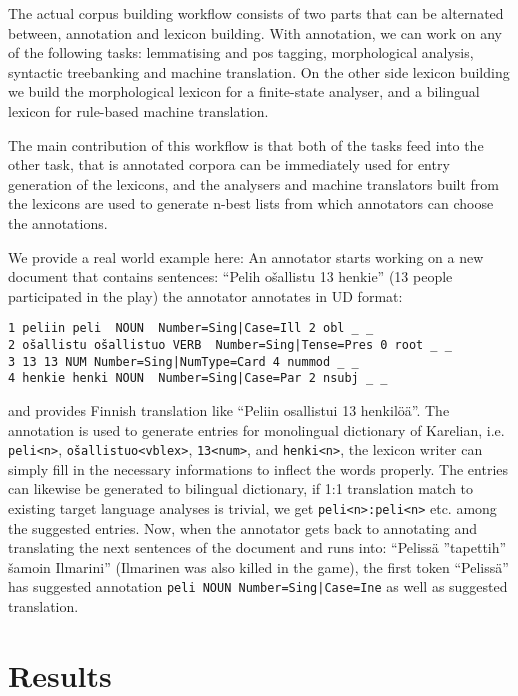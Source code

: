 \documentclass{flammie}
\begin{document}
The actual corpus building workflow consists of two parts that can be
alternated between, annotation and lexicon building. With annotation, we can
work on any of the following tasks: lemmatising and pos tagging, morphological
analysis, syntactic treebanking and machine translation. On the other side
lexicon building we build the morphological lexicon for a finite-state analyser,
and a bilingual lexicon for rule-based machine translation.

The main contribution of this workflow is that both of the tasks feed into
the other task, that is annotated corpora can be immediately used for entry
generation of the lexicons, and the analysers and machine translators
built from the lexicons are used to generate n-best lists from which annotators
can choose the annotations.

We provide a real world example here: An annotator starts working on a new
document that contains sentences: ``Pelih ošallistu 13 henkie'' (13 people
participated in the play) the annotator annotates in UD format:
\begin{scriptsize}
\begin{verbatim}
1 peliin peli  NOUN  Number=Sing|Case=Ill 2 obl _ _
2 ošallistu ošallistuo VERB  Number=Sing|Tense=Pres 0 root _ _
3 13 13 NUM Number=Sing|NumType=Card 4 nummod _ _
4 henkie henki NOUN  Number=Sing|Case=Par 2 nsubj _ _
\end{verbatim}
\end{scriptsize}
and provides Finnish translation like ``Peliin
osallistui 13 henkilöä''.  The annotation is used to generate entries for
monolingual dictionary of Karelian, i.e. \verb|peli<n>|,
\verb|ošallistuo<vblex>|, \verb|13<num>|, and \verb|henki<n>|, the lexicon
writer can simply fill in the necessary informations to inflect the words
properly. The entries can likewise be generated to bilingual dictionary, if 1:1
translation match to existing target language analyses is trivial, we get
\verb|peli<n>:peli<n>| etc. among the suggested entries. Now, when the
annotator gets back to annotating and translating the next sentences of the
document and runs into: ``Pelissä ”tapettih” šamoin Ilmarini'' (Ilmarinen was
also killed in the game), the first token ``Pelissä'' has suggested annotation
\texttt{peli NOUN Number=Sing|Case=Ine} as well as suggested translation.


\section{Results}
\label{sec:results}
\end{document}
